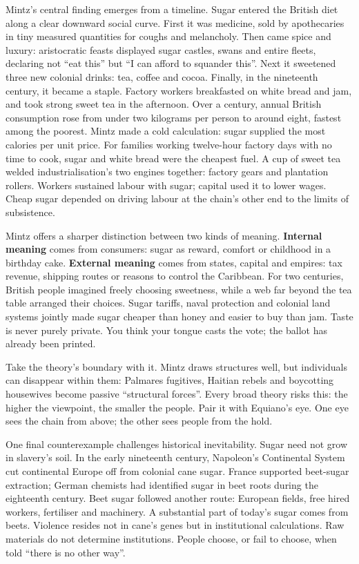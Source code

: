 Mintz's central finding emerges from a timeline. Sugar entered the British diet along a clear downward social curve. First it was medicine, sold by apothecaries in tiny measured quantities for coughs and melancholy. Then came spice and luxury: aristocratic feasts displayed sugar castles, swans and entire fleets, declaring not ``eat this'' but ``I can afford to squander this''. Next it sweetened three new colonial drinks: tea, coffee and cocoa. Finally, in the nineteenth century, it became a staple. Factory workers breakfasted on white bread and jam, and took strong sweet tea in the afternoon. Over a century, annual British consumption rose from under two kilograms per person to around eight, fastest among the poorest. Mintz made a cold calculation: sugar supplied the most calories per unit price. For families working twelve-hour factory days with no time to cook, sugar and white bread were the cheapest fuel. A cup of sweet tea welded industrialisation's two engines together: factory gears and plantation rollers. Workers sustained labour with sugar; capital used it to lower wages. Cheap sugar depended on driving labour at the chain's other end to the limits of subsistence.

Mintz offers a sharper distinction between two kinds of meaning. \textbf{Internal meaning} comes from consumers: sugar as reward, comfort or childhood in a birthday cake. \textbf{External meaning} comes from states, capital and empires: tax revenue, shipping routes or reasons to control the Caribbean. For two centuries, British people imagined freely choosing sweetness, while a web far beyond the tea table arranged their choices. Sugar tariffs, naval protection and colonial land systems jointly made sugar cheaper than honey and easier to buy than jam. Taste is never purely private. You think your tongue casts the vote; the ballot has already been printed.

Take the theory's boundary with it. Mintz draws structures well, but individuals can disappear within them: Palmares fugitives, Haitian rebels and boycotting housewives become passive ``structural forces''. Every broad theory risks this: the higher the viewpoint, the smaller the people. Pair it with Equiano's eye. One eye sees the chain from above; the other sees people from the hold.

One final counterexample challenges historical inevitability. Sugar need not grow in slavery's soil. In the early nineteenth century, Napoleon's Continental System cut continental Europe off from colonial cane sugar. France supported beet-sugar extraction; German chemists had identified sugar in beet roots during the eighteenth century. Beet sugar followed another route: European fields, free hired workers, fertiliser and machinery. A substantial part of today's sugar comes from beets. Violence resides not in cane's genes but in institutional calculations. Raw materials do not determine institutions. People choose, or fail to choose, when told ``there is no other way''.

